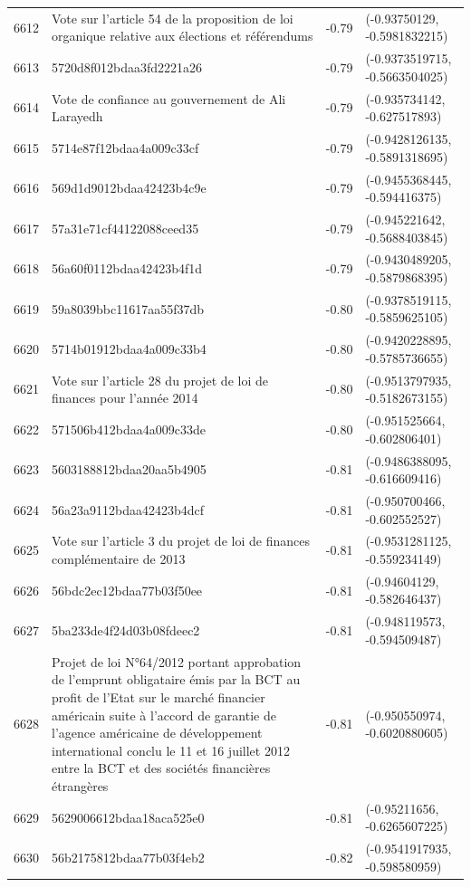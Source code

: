 \begin{table}[ht]
\begin{tabular}{rlrl}
  6612 & Vote sur l'article 54 de la proposition de loi organique relative aux élections et référendums & -0.79 & (-0.93750129, -0.5981832215) \\ 
  6613 & 5720d8f012bdaa3fd2221a26 & -0.79 & (-0.9373519715, -0.5663504025) \\ 
  6614 & Vote de confiance au gouvernement de Ali Larayedh & -0.79 & (-0.935734142, -0.627517893) \\ 
  6615 & 5714e87f12bdaa4a009c33cf & -0.79 & (-0.9428126135, -0.5891318695) \\ 
  6616 & 569d1d9012bdaa42423b4c9e & -0.79 & (-0.9455368445, -0.594416375) \\ 
  6617 & 57a31e71cf44122088ceed35 & -0.79 & (-0.945221642, -0.5688403845) \\ 
  6618 & 56a60f0112bdaa42423b4f1d & -0.79 & (-0.9430489205, -0.5879868395) \\ 
  6619 & 59a8039bbc11617aa55f37db & -0.80 & (-0.9378519115, -0.5859625105) \\ 
  6620 & 5714b01912bdaa4a009c33b4 & -0.80 & (-0.9420228895, -0.5785736655) \\ 
  6621 & Vote sur l'article 28 du projet de loi de finances pour l'année 2014 & -0.80 & (-0.9513797935, -0.5182673155) \\ 
  6622 & 571506b412bdaa4a009c33de & -0.80 & (-0.951525664, -0.602806401) \\ 
  6623 & 5603188812bdaa20aa5b4905 & -0.81 & (-0.9486388095, -0.616609416) \\ 
  6624 & 56a23a9112bdaa42423b4dcf & -0.81 & (-0.950700466, -0.602552527) \\ 
  6625 & Vote sur l'article 3 du projet de loi de finances complémentaire de 2013 & -0.81 & (-0.9531281125, -0.559234149) \\ 
  6626 & 56bdc2ec12bdaa77b03f50ee & -0.81 & (-0.94604129, -0.582646437) \\ 
  6627 & 5ba233de4f24d03b08fdeec2 & -0.81 & (-0.948119573, -0.594509487) \\ 
  6628 & Projet de loi N°64/2012 portant approbation de l'emprunt obligataire émis par la BCT au profit de l'Etat sur le marché financier américain suite à l'accord de garantie de l'agence américaine de développement international conclu le 11 et 16 juillet 2012 entre la BCT et des sociétés financières étrangères & -0.81 & (-0.950550974, -0.6020880605) \\ 
  6629 & 5629006612bdaa18aca525e0 & -0.81 & (-0.95211656, -0.6265607225) \\ 
  6630 & 56b2175812bdaa77b03f4eb2 & -0.82 & (-0.9541917935, -0.598580959) \\ 

\end{tabular}
\end{table}
